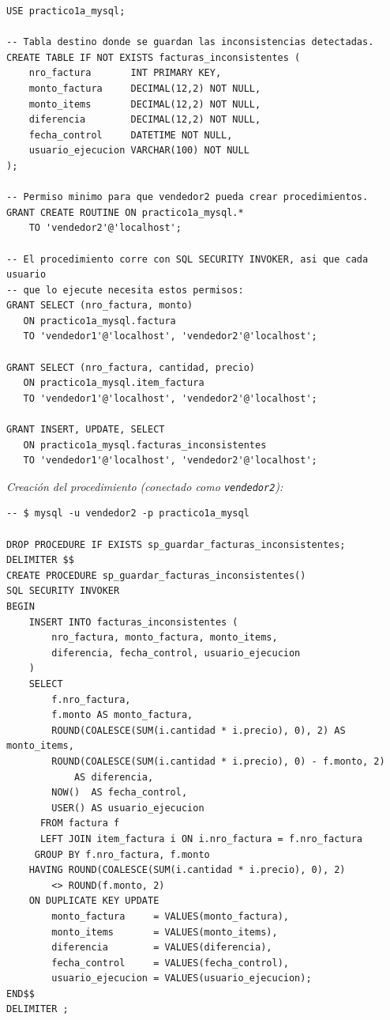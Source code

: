 \documentclass[11pt,a4paper]{article}
\begin{document}
\begin{lstlisting}
USE practico1a_mysql;

-- Tabla destino donde se guardan las inconsistencias detectadas.
CREATE TABLE IF NOT EXISTS facturas_inconsistentes (
    nro_factura       INT PRIMARY KEY,
    monto_factura     DECIMAL(12,2) NOT NULL,
    monto_items       DECIMAL(12,2) NOT NULL,
    diferencia        DECIMAL(12,2) NOT NULL,
    fecha_control     DATETIME NOT NULL,
    usuario_ejecucion VARCHAR(100) NOT NULL
);

-- Permiso minimo para que vendedor2 pueda crear procedimientos.
GRANT CREATE ROUTINE ON practico1a_mysql.*
    TO 'vendedor2'@'localhost';

-- El procedimiento corre con SQL SECURITY INVOKER, asi que cada usuario
-- que lo ejecute necesita estos permisos:
GRANT SELECT (nro_factura, monto)
   ON practico1a_mysql.factura
   TO 'vendedor1'@'localhost', 'vendedor2'@'localhost';

GRANT SELECT (nro_factura, cantidad, precio)
   ON practico1a_mysql.item_factura
   TO 'vendedor1'@'localhost', 'vendedor2'@'localhost';

GRANT INSERT, UPDATE, SELECT
   ON practico1a_mysql.facturas_inconsistentes
   TO 'vendedor1'@'localhost', 'vendedor2'@'localhost';
\end{lstlisting}

\textit{Creación del procedimiento (conectado como \texttt{vendedor2}):}

\begin{lstlisting}
-- $ mysql -u vendedor2 -p practico1a_mysql

DROP PROCEDURE IF EXISTS sp_guardar_facturas_inconsistentes;
DELIMITER $$
CREATE PROCEDURE sp_guardar_facturas_inconsistentes()
SQL SECURITY INVOKER
BEGIN
    INSERT INTO facturas_inconsistentes (
        nro_factura, monto_factura, monto_items,
        diferencia, fecha_control, usuario_ejecucion
    )
    SELECT
        f.nro_factura,
        f.monto AS monto_factura,
        ROUND(COALESCE(SUM(i.cantidad * i.precio), 0), 2) AS monto_items,
        ROUND(COALESCE(SUM(i.cantidad * i.precio), 0) - f.monto, 2)
            AS diferencia,
        NOW()  AS fecha_control,
        USER() AS usuario_ejecucion
      FROM factura f
      LEFT JOIN item_factura i ON i.nro_factura = f.nro_factura
     GROUP BY f.nro_factura, f.monto
    HAVING ROUND(COALESCE(SUM(i.cantidad * i.precio), 0), 2)
        <> ROUND(f.monto, 2)
    ON DUPLICATE KEY UPDATE
        monto_factura     = VALUES(monto_factura),
        monto_items       = VALUES(monto_items),
        diferencia        = VALUES(diferencia),
        fecha_control     = VALUES(fecha_control),
        usuario_ejecucion = VALUES(usuario_ejecucion);
END$$
DELIMITER ;
\end{lstlisting}
\end{document}
